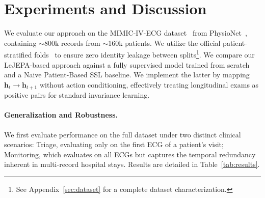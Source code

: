\section{Experiments and Discussion}

We evaluate our approach on the MIMIC-IV-ECG dataset~\citep{gow2023mimic} from PhysioNet~\citep{goldberger2000physiobank}, containing $\sim$800k records from $\sim$160k patients. We utilize the official patient-stratified folds~\citep{strodthoff2024mimic} to ensure zero identity leakage between splits\footnote{See Appendix~\ref{sec:dataset} for a complete dataset characterization.}. We compare our LeJEPA-based approach against a fully supervised model trained from scratch and a Naive Patient-Based SSL baseline. We implement the latter by mapping $\mathbf{h}_t \to \mathbf{h}_{t+1}$ without action conditioning, effectively treating longitudinal exams as positive pairs for standard invariance learning.

\paragraph{Generalization and Robustness.} We first evaluate performance on the full dataset under two distinct clinical scenarios: Triage, evaluating only on the first ECG of a patient's visit; Monitoring, which evaluates on all ECGs but captures the temporal redundancy inherent in multi-record hospital stays. Results are detailed in Table~\ref{tab:results}.

